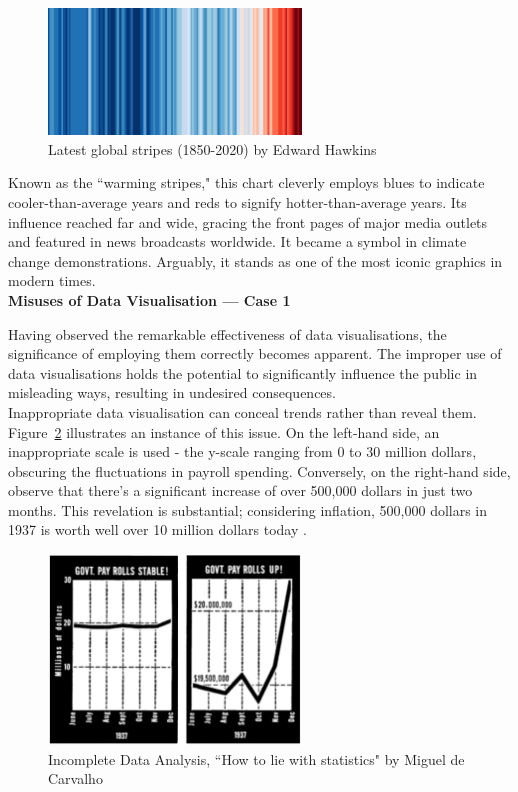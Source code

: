 \documentclass{article}\usepackage[]{graphicx}\usepackage[]{xcolor}
\numberwithin{equation}{section}
\begin{document}
\begin{figure}[H]
    \centering
    \includegraphics[width=0.6\textwidth]{image_reference/global.png}
    \caption{Latest global stripes (1850-2020) by Edward Hawkins \cite{blog}}
    \label{fig:global}
\end{figure}

\noindent 
Known as the ``warming stripes," this chart cleverly employs blues to indicate cooler-than-average years and reds to signify hotter-than-average years. Its influence reached far and wide, gracing the front pages of major media outlets and featured in news broadcasts worldwide. It became a symbol in climate change demonstrations. Arguably, it stands as one of the most iconic graphics in modern times.\\

\noindent
\textbf{Misuses of Data Visualisation — Case 1}

\noindent
Having observed the remarkable effectiveness of data visualisations, the significance of employing them correctly becomes apparent. The improper use of data visualisations holds the potential to significantly influence the public in misleading ways, resulting in undesired consequences.\\

\noindent
Inappropriate data visualisation can conceal trends rather than reveal them. Figure~\ref{fig:misuse1} illustrates an instance of this issue. On the left-hand side, an inappropriate scale is used - the y-scale ranging from 0 to 30 million dollars, obscuring the fluctuations in payroll spending. Conversely, on the right-hand side, observe that there's a significant increase of over 500,000 dollars in just two months. This revelation is substantial; considering inflation, 500,000 dollars in 1937 is worth well over 10 million dollars today \cite{worth}.

\begin{figure}[H]
    \centering
    \includegraphics[width=0.6\textwidth]{image_reference/misuse1.png}
    \caption{Incomplete Data Analysis, ``How to lie with statistics" by Miguel de Carvalho \cite{lie}}
    \label{fig:misuse1}
\end{figure}
\end{document}
